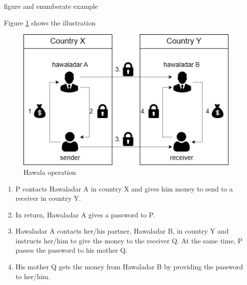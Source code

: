 figure and enumberate example

Figure \ref{fig:hawala} shows the illustration

\begin{figure}[htbp]
    \centering
    \includegraphics[scale = 0.6]{img/hawala.png}
    \caption{Hawala operation}
    \label{fig:hawala}
\end{figure}

\begin{enumerate}
    \item P contacts Hawaladar A in country X and gives him money to send to a receiver in country Y.
    \item In return, Hawaladar A gives a password to P.
    \item Hawaladar A contacts her/his partner, Hawaladar B, in country Y and instructs her/him to give the money to the receiver Q. At the same time, P passes the password to his mother Q.
    \item His mother Q gets the money from Hawaladar B by providing the password to her/him.
\end{enumerate}
